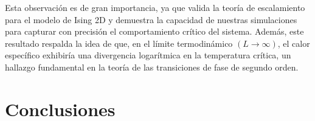 \documentclass[twocolumn]{article}
\begin{document}
Esta observación es de gran importancia, ya que valida la teoría de escalamiento para el modelo de Ising 2D y demuestra la capacidad de nuestras simulaciones para capturar con precisión el comportamiento crítico del sistema. Además, este resultado respalda la idea de que, en el límite termodinámico $(L \to \infty)$, el calor específico exhibiría una divergencia logarítmica en la temperatura crítica, un hallazgo fundamental en la teoría de las transiciones de fase de segundo orden.




\section{Conclusiones}



\end{document}
